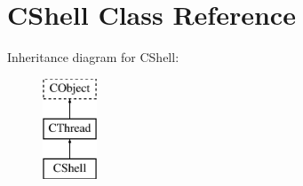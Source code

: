\hypertarget{class_c_shell}{\section{C\-Shell Class Reference}
\label{class_c_shell}
}
Inheritance diagram for C\-Shell\-:\begin{figure}[H]
\begin{center}
\leavevmode
\includegraphics[height=3.000000cm]{class_c_shell}
\end{center}
\end{figure}
